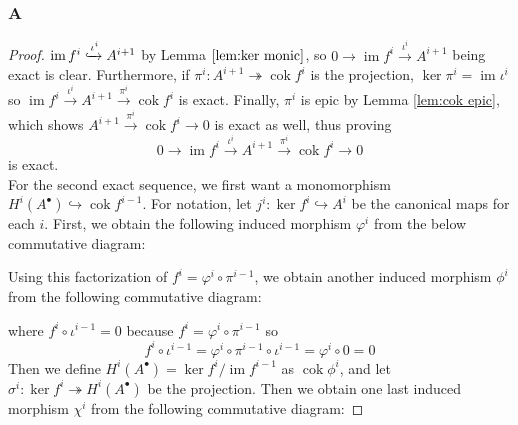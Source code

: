 \documentclass{article}
\DeclareMathOperator{\im}{im}
\DeclareMathOperator{\cok}{cok}
\begin{document}
\subsubsection{A}\label{1.6.A}
\begin{proof}
    $\im f^i\xhookrightarrow{\iota^i} A^{i+1}$ by Lemma $\ref{lem:ker monic}$, so $0\rightarrow \im f^i \xrightarrow{\iota^i} A^{i+1}$ being exact is clear. Furthermore, if $\pi^i:A^{i+1}\twoheadrightarrow \cok f^i$ is the projection, $\ker \pi^i=\im \iota^i$ so $\im f^i \xrightarrow{\iota^i} A^{i+1}\xrightarrow{\pi^i} \cok f^i$ is exact. Finally, $\pi^i$ is epic by Lemma \ref{lem:cok epic}, which shows $A^{i+1}\xrightarrow{\pi^i} \cok f^i\rightarrow 0$ is exact as well, thus proving
    \[
    0\rightarrow \im f^i\xrightarrow{\iota^i} A^{i+1}\xrightarrow{\pi^i} \cok f^i \rightarrow 0
    \]
    is exact.\\
    For the second exact sequence, we first want a monomorphism $H^i(A^\bullet)\hookrightarrow \cok f^{i-1}$. For notation, let $j^i:\ker f^i\hookrightarrow A^i$ be the canonical maps for each $i$. First, we obtain the following induced morphism $\varphi^i$ from the below commutative diagram:
    \begin{center}
    \end{center}
    Using this factorization of $f^i=\varphi^i\circ \pi^{i-1}$, we obtain another induced morphism $\phi^i$ from the following commutative diagram:
    \begin{center}
    \end{center}
    where $f^i\circ \iota^{i-1}=0$ because $f^i=\varphi^i\circ \pi^{i-1}$ so
    \[
    f^i\circ \iota^{i-1}=\varphi^i\circ \pi^{i-1}\circ \iota^{i-1}=\varphi^i\circ 0=0
    \]
    Then we define $H^i(A^\bullet)=\ker f^i/\im f^{i-1}$ as $\cok \phi^i$, and let $\sigma^i:\ker f^i \twoheadrightarrow H^i(A^\bullet)$ be the projection. Then we obtain one last induced morphism $\chi^i$ from the following commutative diagram:

\end{proof}
\end{document}
